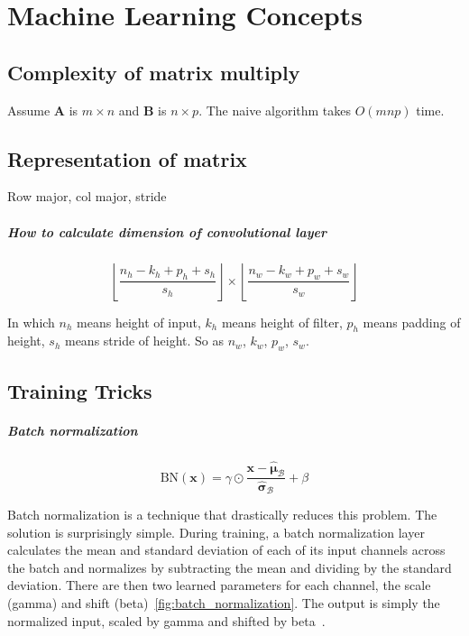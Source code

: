 \chapter{Machine Learning Concepts}\label{chap:Notes}

\section{Complexity of matrix multiply}\label{sec:Complexity of matrix multiply}

Assume $\mathbf{A}$ is $m\times n$ and $\mathbf{B}$ is $n\times p$.
The naive algorithm takes $O\left(mnp\right)$ time.

\section{Representation of matrix}\label{sec:Representation of matrix}

Row major, col major, stride

\paragraph{How to calculate dimension of convolutional layer}

\[ \left\lfloor \frac{n_h - k_h + p_h + s_h}{s_h} \right\rfloor \times \left\lfloor \frac{n_w - k_w + p_w + s_w}{s_w} \right\rfloor \]

In which  \(n_h\)  means height of input, \(k_h\) means height of filter, \(p_h\) means padding of height, \(s_h\) means stride of height. So as \(n_w\), \(k_w\), \(p_w\), \(s_w\).

\section{Training Tricks}\label{sec:Training Tricks}

\paragraph{Batch normalization}

\[
	\textrm{BN}\left(\bm{x}\right)  = \gamma  \odot \frac{\bm{x} - \hat{\bm \mu}_\mathcal{B}}{\hat{\bm \sigma}_\mathcal{B}} + \beta
\]

Batch normalization is a technique that drastically reduces this problem.
The solution is surprisingly simple.
During training, a batch normalization layer calculates the mean and standard deviation of each of its input channels across the batch and normalizes by subtracting the mean and dividing by the standard deviation.
There are then two learned parameters for each channel, the scale (gamma) and shift (beta)~\cref{fig:batch_normalization}.
The output is simply the normalized input, scaled by gamma and shifted by beta~\cite{foster2022generative}.

